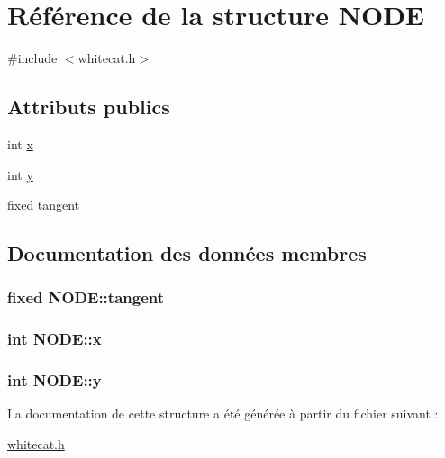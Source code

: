 \hypertarget{struct_n_o_d_e}{\section{Référence de la structure N\+O\+D\+E}
\label{struct_n_o_d_e}
}


{\ttfamily \#include $<$whitecat.\+h$>$}

\subsection*{Attributs publics}
\begin{DoxyCompactItemize}
\item 
int \hyperlink{struct_n_o_d_e_ae491648fdefa758c04fd1b39997dfe44}{x}
\item 
int \hyperlink{struct_n_o_d_e_a1c83ccf922c1655a4f4cc90fb7455670}{y}
\item 
fixed \hyperlink{struct_n_o_d_e_ab9675cd84cb7ccf6e2506c7ee233fa2c}{tangent}
\end{DoxyCompactItemize}


\subsection{Documentation des données membres}
\hypertarget{struct_n_o_d_e_ab9675cd84cb7ccf6e2506c7ee233fa2c}{
\subsubsection[{tangent}]{\setlength{\rightskip}{0pt plus 5cm}fixed N\+O\+D\+E\+::tangent}}\label{struct_n_o_d_e_ab9675cd84cb7ccf6e2506c7ee233fa2c}
\hypertarget{struct_n_o_d_e_ae491648fdefa758c04fd1b39997dfe44}{
\subsubsection[{x}]{\setlength{\rightskip}{0pt plus 5cm}int N\+O\+D\+E\+::x}}\label{struct_n_o_d_e_ae491648fdefa758c04fd1b39997dfe44}
\hypertarget{struct_n_o_d_e_a1c83ccf922c1655a4f4cc90fb7455670}{
\subsubsection[{y}]{\setlength{\rightskip}{0pt plus 5cm}int N\+O\+D\+E\+::y}}\label{struct_n_o_d_e_a1c83ccf922c1655a4f4cc90fb7455670}


La documentation de cette structure a été générée à partir du fichier suivant \+:\begin{DoxyCompactItemize}
\item 
\hyperlink{whitecat_8h}{whitecat.\+h}\end{DoxyCompactItemize}

